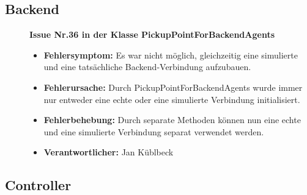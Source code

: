 \documentclass[parskip=full]{scrartcl}
\begin{document}
\clearpage
\subsection{Backend}

\begin{description}

\item []\textbf{Issue Nr.36 in der Klasse PickupPointForBackendAgents} 

\begin{itemize}
\item []\textbf{Fehlersymptom:} Es war nicht möglich, gleichzeitig eine simulierte und eine tatsächliche Backend-Verbindung aufzubauen.
\item []\textbf{Fehlerursache:} Durch PickupPointForBackendAgents wurde immer nur entweder eine echte oder eine simulierte Verbindung initialisiert.
\item []\textbf{Fehlerbehebung:} Durch separate Methoden können nun eine echte und eine simulierte Verbindung separat verwendet werden.
\item []\textbf{Verantwortlicher:} Jan Küblbeck
\end{itemize}

\end{description}


\clearpage
\subsection{Controller}



\clearpage
\end{document}
